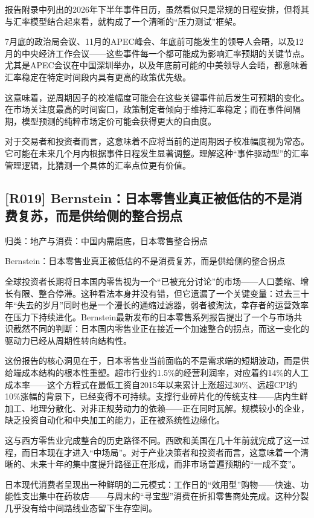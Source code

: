 \documentclass[11pt]{ctexart}
\begin{document}
报告附录中列出的2026年下半年事件日历，虽然看似只是常规的日程安排，但将其与汇率模型结合起来看，就构成了一个清晰的“压力测试”框架。

7月底的政治局会议、11月的APEC峰会、年底前可能发生的领导人会晤，以及12月的中央经济工作会议——这些事件每一个都可能成为影响汇率预期的关键节点。尤其是APEC会议在中国深圳举办，以及年底前可能的中美领导人会晤，都意味着汇率稳定在特定时间段内具有更高的政策优先级。

这意味着，逆周期因子的校准幅度可能会在这些关键事件前后发生可预期的变化。在市场关注度最高的时间窗口，政策制定者倾向于维持汇率稳定；而在事件间隔期，模型预测的纯粹市场定价可能会获得更大的自由度。

对于交易者和投资者而言，这意味着不应将当前的逆周期因子校准幅度视为常态。它可能在未来几个月内根据事件日程发生显著调整。理解这种“事件驱动型”的汇率管理逻辑，比猜测一个具体的汇率点位更有价值。

\subsection{[R019] Bernstein：日本零售业真正被低估的不是消费复苏，而是供给侧的整合拐点}
{\small\color{refgray}归类：地产与消费：中国内需磨底，日本零售整合拐点}

Bernstein：日本零售业真正被低估的不是消费复苏，而是供给侧的整合拐点

全球投资者长期将日本国内零售视为一个“已被充分讨论”的市场——人口萎缩、增长有限、整合停滞。这种看法本身并没有错，但它遗漏了一个关键变量：过去三十年“失去的岁月”同时也是一个漫长的通缩过滤器，弱者被淘汰，幸存者的运营效率在压力下持续进化。Bernstein最新发布的日本零售系列报告提出了一个与市场共识截然不同的判断：日本国内零售业正在接近一个加速整合的拐点，而这一变化的驱动力已经从周期性转向结构性。

这份报告的核心洞见在于，日本零售业当前面临的不是需求端的短期波动，而是供给端成本结构的根本性重塑。超市行业约1.5\%的经营利润率，对应着约14\%的人工成本率——这个方程式在最低工资自2015年以来累计上涨超过30\%、远超CPI约10\%涨幅的背景下，已经变得不可持续。支撑行业碎片化的传统支柱——店内生鲜加工、地理分散化、对非正规劳动力的依赖——正在同时瓦解。规模较小的企业，缺乏投资自动化和中央加工的能力，正在被系统性边缘化。

这与西方零售业完成整合的历史路径不同。西欧和美国在几十年前就完成了这一过程，而日本现在才进入“中场局”。对于产业决策者和投资者而言，这意味着一个清晰的、未来十年的集中度提升路径正在形成，而非市场普遍预期的“一成不变”。

日本现代消费者呈现出一种鲜明的二元模式：工作日的“效用型”购物——快速、功能性支出集中在药妆店——与周末的“寻宝型”消费在折扣零售商处完成。这种分裂几乎没有给中间路线业态留下生存空间。
\end{document}
